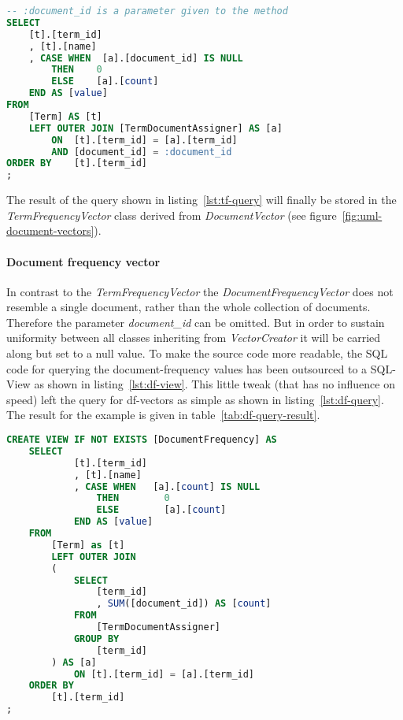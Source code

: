 \begin{lstlisting}[language=SQL,caption={SQL query for generating tf-vectors},label={lst:tf-query},float=h]
-- :document_id is a parameter given to the method
SELECT
    [t].[term_id]
    , [t].[name]
    , CASE WHEN  [a].[document_id] IS NULL
        THEN    0
        ELSE    [a].[count]
    END AS [value]
FROM
    [Term] AS [t]
    LEFT OUTER JOIN [TermDocumentAssigner] AS [a]
        ON  [t].[term_id] = [a].[term_id]
        AND [document_id] = :document_id
ORDER BY    [t].[term_id]
;
\end{lstlisting}

\noindent
The result of the query shown in listing~\ref{lst:tf-query} will finally be stored in the \textit{TermFrequencyVector} class derived from \textit{DocumentVector} (see figure~\ref{fig:uml-document-vectors}).

\paragraph{Document frequency vector}
In contrast to the \textit{TermFrequencyVector} the \textit{DocumentFrequencyVector} does not resemble a single document, rather than the whole collection of documents.
Therefore the parameter \textit{document\_id} can be omitted.
But in order to sustain uniformity between all classes inheriting from \textit{VectorCreator} it will be carried along but set to a null value.
To make the source code more readable, the SQL code for querying the document-frequency values has been outsourced to a SQL-View as shown in listing~\ref{lst:df-view}.
This little tweak (that has no influence on speed) left the query for df-vectors as simple as shown in listing~\ref{lst:df-query}.
The result for the example is given in table~\ref{tab:df-query-result}.

\begin{lstlisting}[language=SQL,caption={SQL statement to create the \textit{DocumentFrequency}-view},label={lst:df-view},float=h]
CREATE VIEW IF NOT EXISTS [DocumentFrequency] AS
    SELECT
            [t].[term_id]
            , [t].[name]
            , CASE WHEN   [a].[count] IS NULL
                THEN        0
                ELSE        [a].[count]
            END AS [value]
    FROM
        [Term] as [t]
        LEFT OUTER JOIN
        (
            SELECT
                [term_id]
                , SUM([document_id]) AS [count]
            FROM
                [TermDocumentAssigner]
            GROUP BY
                [term_id]
        ) AS [a]
            ON [t].[term_id] = [a].[term_id]
    ORDER BY
        [t].[term_id]
;
\end{lstlisting}

